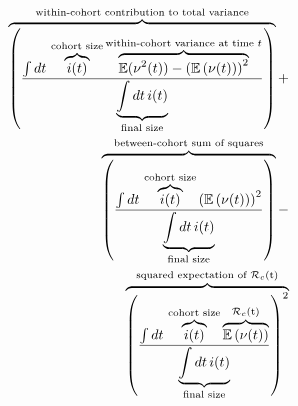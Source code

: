 \documentclass[12pt]{article}
\newcommand{\Rx}[1]{\ensuremath{\mathcal{R}_{#1}}}
\newcommand{\Rc}{\Rx{c}}
\begin{document}
\begin{equation}
    \begin{aligned}
    &&\\ \overbrace{\left(\frac{\int{
        dt\, \overbrace{i(t)}^{\text{cohort size}}
        \overbrace{\mathbb{E}(\nu^2(t))-\left(\mathbb{E}\left(\nu(t)\right)\right)^2}^{\text{within-cohort variance at time $t$}}
        }} {\underbrace{\int{dt\, i(t)}}_{\text{final size}}}\right)}^{\text{within-cohort contribution to total variance}} + 
    &&\\ \overbrace{\left(\frac{\int{
        dt\, \overbrace{i(t)}^{\text{cohort size}}
        \left(\mathbb{E}\left(\nu(t)\right)\right)^2}
        }{\underbrace{\int{dt\, i(t)}}_{\text{final size}}}\right)}^{\text{between-cohort sum of squares}} -
    &&\\ \overbrace{\left(\frac{\int{
        dt\, \overbrace{i(t)}^{\text{cohort size}}
        \overbrace{\mathbb{E}\left(\nu(t)\right)}^{\text{\Rc(t)}}
        }}{\underbrace{\int{dt\, i(t)}}_{\text{final size}}}\right)^2}^{\text{squared expectation of \Rc(t)}}
    \end{aligned}
\end{equation}
\end{document}
